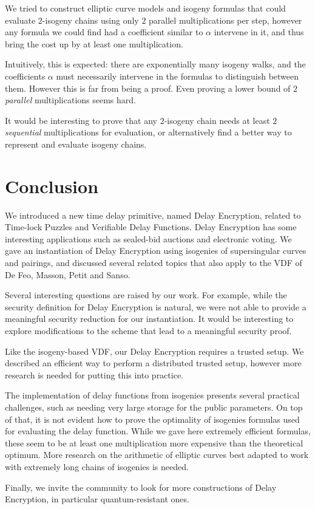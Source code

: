 \documentclass{llncs}
\begin{document}
We tried to construct elliptic curve models and isogeny formulas that
could evaluate $2$-isogeny chains using only $2$ parallel
multiplications per step, however any formula we could find had a
coefficient similar to $\alpha$ intervene in it, and thus bring the
cost up by at least one multiplication.

Intuitively, this is expected: there are exponentially many isogeny
walks, and the coefficients $\alpha$ must necessarily intervene in the
formulas to distinguish between them. %
However this is far from being a proof. %
Even proving a lower bound of $2$ \emph{parallel} multiplications
seems hard.

It would be interesting to prove that any $2$-isogeny chain needs at
least $2$ \emph{sequential} multiplications for evaluation, or
alternatively find a better way to represent and evaluate isogeny
chains.


\section{Conclusion}

We introduced a new time delay primitive, named Delay Encryption,
related to Time-lock Puzzles and Verifiable Delay Functions. %
Delay Encryption has some interesting applications such as sealed-bid
auctions and electronic voting. %
We gave an instantiation of Delay Encryption using isogenies of
supersingular curves and pairings, and discussed several related
topics that also apply to the VDF of De Feo, Masson, Petit and Sanso.

Several interesting questions are raised by our work. %
For example, while the security definition for Delay Encryption is
natural, we were not able to provide a meaningful security reduction
for our instantiation. %
It would be interesting to explore modifications to the scheme that
lead to a meaningful security proof.

Like the isogeny-based VDF, our Delay Encryption requires a trusted
setup. %
We described an efficient way to perform a distributed trusted setup,
however more research is needed for putting this into practice.

The implementation of delay functions from isogenies presents several
practical challenges, such as needing very large storage for the
public parameters. %
On top of that, it is not evident how to prove the optimality of
isogenies formulas used for evaluating the delay function. %
While we gave here extremely efficient formulas, these seem to be at
least one multiplication more expensive than the theoretical
optimum. %
More research on the arithmetic of elliptic curves best adapted to
work with extremely long chains of isogenies is needed.

Finally, we invite the community to look for more constructions of
Delay Encryption, in particular quantum-resistant ones.

\def\doi#1{\href{https://doi.org/#1}{\tt https://doi.org/\nolinkurl{#1}}}


\end{document}
